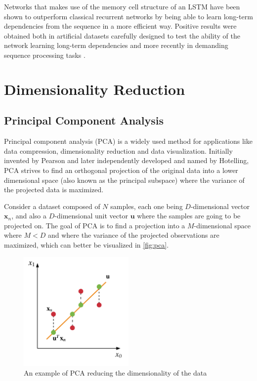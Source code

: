 \documentclass{kththesis}
\begin{document}
Networks that makes use of the memory cell structure of an LSTM have been shown to outperform classical recurrent networks by being able to learn long-term dependencies from the sequence in a more efficient way. Positive results were obtained both in artificial datasets carefully designed to test the ability of the network learning long-term dependencies \citep{bengio1994learning} and more recently in demanding sequence processing tasks \citep{graves2013speech}\citep{sutskever2014sequence}.

\section{Dimensionality Reduction}

\subsection{Principal Component Analysis}

Principal component analysis (PCA) is a widely used method for applications like data compression, dimensionality reduction and data visualization. Initially invented by Pearson\citep{pearson1901liii} and later independently developed and named by Hotelling\citep{hotelling1933analysis}, PCA strives to find an orthogonal projection of the original data into a lower dimensional space (also known as the principal subspace) where the variance of the projected data is maximized.

Consider a dataset composed of $N$ samples, each one being $D$-dimensional vector $\mathbf{x}_n$, and also a $D$-dimensional unit vector $\mathbf{u}$ where the samples are going to be projected on. The goal of PCA is to find a projection into a $M$-dimensional space where $M < D$ and where the variance of the projected observations are maximized, which can better be visualized in \autoref{fig:pca}.

\begin{figure}[h]
    \centering
    \includegraphics[width=0.5\textwidth,keepaspectratio]{figures/pca.pdf}
    \caption{An example of PCA reducing the dimensionality of the data}
    \label{fig:pca}
\end{figure}
\end{document}
